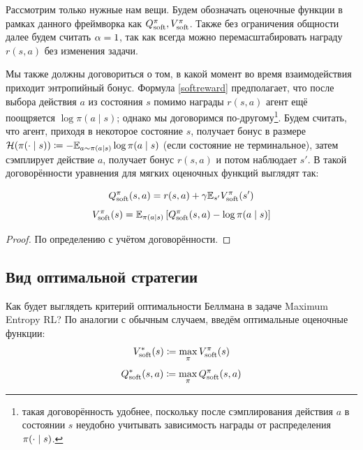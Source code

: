 Рассмотрим только нужные нам вещи. Будем обозначать оценочные функции в рамках данного фреймворка как $Q^\pi_{\mathrm{soft}}, V^\pi_{\mathrm{soft}}$. Также без ограничения общности далее будем считать $\alpha \HM= 1$, так как всегда можно перемасштабировать награду $r(s, a)$ без изменения задачи.

Мы также должны договориться о том, в какой момент во время взаимодействия приходит энтропийный бонус. Формула \eqref{softreward} предполагает, что после выбора действия $a$ из состояния $s$ помимо награды $r(s, a)$ агент ещё поощряется $\log \pi(a \mid s)$; однако мы договоримся по-другому\footnote{такая договорённость удобнее, поскольку после сэмплирования действия $a$ в состоянии $s$ неудобно учитывать зависимость награды от распределения $\pi(\cdot \HM\mid s)$.}. Будем считать, что агент, приходя в некоторое состояние $s$, получает бонус в размере $\entropy(\pi(\cdot \mid s)) \HM\coloneqq - \E_{a \sim \pi(a \mid s)} \log \pi(a \mid s)$ (если состояние не терминальное), затем сэмплирует действие $a$, получает бонус $r(s, a)$ и потом наблюдает $s'$. В такой договорённости уравнения для мягких оценочных функций выглядят так:

\begin{theorem}
$$Q^\pi_{\mathrm{soft}}(s, a) = r(s, a) + \gamma \mathbb{E}_{s'} V^\pi_{\mathrm{soft}}(s')$$
\begin{equation}\label{softVQ}
V^\pi_{\mathrm{soft}}(s) = \mathbb{E}_{\pi(a \mid s)} \left[ Q^\pi_{\mathrm{soft}}(s, a) - \log \pi(a \mid s) \right]
\end{equation}
\begin{proof}
По определению с учётом договорённости.
\end{proof}
\end{theorem}

\subsection{Вид оптимальной стратегии}

Как будет выглядеть критерий оптимальности Беллмана в задаче Maximum Entropy RL? По аналогии с обычным случаем, введём оптимальные оценочные функции:
$$V^*_{\mathrm{soft}}(s) \coloneqq \max_{\pi} V^{\pi}_{\mathrm{soft}}(s)$$
$$Q^*_{\mathrm{soft}}(s, a) \coloneqq \max_{\pi} Q^{\pi}_{\mathrm{soft}}(s, a)$$

